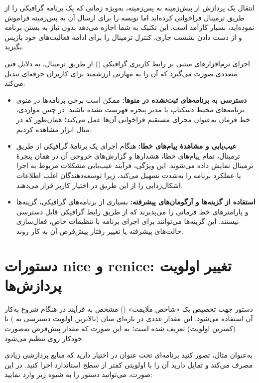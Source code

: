 انتقال یک پردازش از پیش‌زمینه به پس‌زمینه، به‌ویژه زمانی که یک برنامه گرافیکی را از طریق ترمینال فراخوانی کرده‌اید اما نویسه \cmd{\&} را برای ارسال آن به پس‌زمینه فراموش نموده‌اید، بسیار کارآمد است. این تکنیک به شما اجازه می‌دهد بدون نیاز به بستن برنامه و از دست دادن نشست جاری، کنترل ترمینال را برای ادامه فعالیت‌های خود بازپس بگیرید.

اجرای نرم‌افزارهای مبتنی بر رابط کاربری گرافیکی () از طریق ترمینال، به دلایل فنی متعددی صورت می‌گیرد که آن را به مهارتی ارزشمند برای کاربران حرفه‌ای تبدیل می‌کند:

\begin{itemize}
  \item \textbf{دسترسی به برنامه‌های ثبت‌نشده در منوها:} ممکن است برخی برنامه‌ها در منوی برنامه‌های محیط دسکتاپ یا مدیر پنجره فهرست نشده باشند. در چنین مواردی، خط فرمان به‌عنوان مجرای مستقیم فراخوانی آن‌ها عمل می‌کند؛ همان‌طور که در مثال ابزار  مشاهده کردیم.
  \item \textbf{عیب‌یابی و مشاهدهٔ پیام‌های خطا:} هنگام اجرای یک برنامهٔ گرافیکی از طریق ترمینال، تمام پیام‌های خطا، هشدارها و گزارش‌های خروجی آن در همان پنجرهٔ ترمینال نمایش داده می‌شوند. این ویژگی، فرآیند عیب‌یابی مشکلات مربوط به اجرا یا عملکرد برنامه را به‌شدت تسهیل می‌کند، زیرا توسعه‌دهندگان اغلب اطلاعات اشکال‌زدایی را از این طریق در اختیار کاربر قرار می‌دهند.
  \item \textbf{استفاده از گزینه‌ها و آرگومان‌های پیشرفته:} بسیاری از برنامه‌های گرافیکی، گزینه‌ها و پارامترهای خط فرمانی را می‌پذیرند که از طریق رابط گرافیکی قابل دسترسی نیستند. این گزینه‌ها می‌توانند برای اجرای برنامه با تنظیمات خاص، فعال‌سازی حالت‌های پیشرفته یا تغییر رفتار پیش‌فرض آن به کار روند.
\end{itemize}

\section{دستورات nice و renice: تغییر اولویت پردازش‌ها}

دستور  جهت تخصیص یک «شاخص ملایمت» () مشخص به فرآیند در هنگام شروع به‌کار آن استفاده می‌شود. این مقدار عددی در بازه‌ای میان  (بالاترین اولویت دسترسی به ) تا  (کمترین اولویت) تعریف شده است؛ به این صورت که مقدار پیش‌فرض به‌صورت خودکار روی  تنظیم می‌شود.

به‌عنوان مثال، تصور کنید برنامه‌ای تحت عنوان  در اختیار دارید که منابع پردازشی زیادی مصرف می‌کند و تمایل دارید آن را با اولویتی کمتر از سطح استاندارد اجرا کنید. در این صورت، می‌توانید دستور را به شیوه زیر وارد نمایید:

